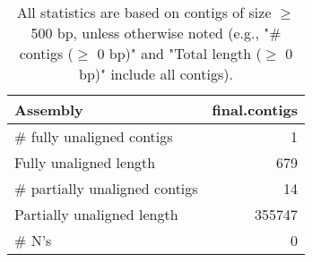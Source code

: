 \documentclass[12pt,a4paper]{article}
\begin{document}
\begin{table}[ht]
\begin{center}
\caption{All statistics are based on contigs of size $\geq$ 500 bp, unless otherwise noted (e.g., "\# contigs ($\geq$ 0 bp)" and "Total length ($\geq$ 0 bp)" include all contigs).}
\begin{tabular}{|l*{1}{|r}|}
\hline
Assembly & final.contigs \\ \hline
\# fully unaligned contigs & 1 \\ \hline
Fully unaligned length & 679 \\ \hline
\# partially unaligned contigs & 14 \\ \hline
Partially unaligned length & 355747 \\ \hline
\# N's & 0 \\ \hline
\end{tabular}
\end{center}
\end{table}
\end{document}
